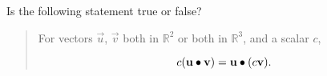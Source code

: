 \documentclass{ximera}
\author{Gregory Hartman \and Matthew Carr}
\begin{document}
\begin{exercise}



Is the following statement true or false?

\begin{quote}
For vectors $\vec{u}$, $\vec{v}$ both in $\mathbb{R}^2$ or both in $\mathbb{R}^3$, and a scalar $c$,

\[
c(\mathbf{u}\bullet\mathbf{v})=\mathbf{u}\bullet(c\mathbf{v})\ldotp
\]

\end{quote}

\begin{multipleChoice}
\end{multipleChoice}

\end{exercise}
\end{document}
